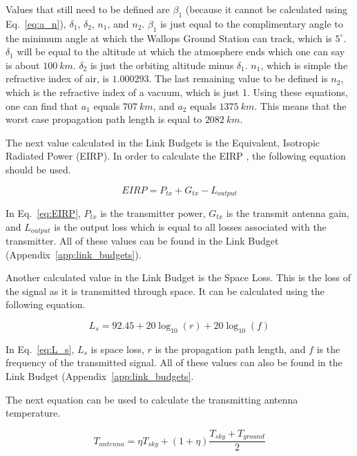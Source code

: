 \documentclass[12pt]{article}
\begin{document}
Values that still need to be defined are $\beta_1$ (because it cannot be calculated using Eq.~\ref{eq:a_n}), $\delta_1$, $\delta_2$, $n_1$, and $n_2$. $\beta_1$ is just equal to the complimentary angle to the minimum angle at which the Wallops Ground Station can track, which is $5^\circ$. $\delta_1$ will be equal to the altitude at which the atmosphere ends which one can say is about $100\ km$. $\delta_2$ is just the orbiting altitude minus $\delta_1$. $n_1$, which is simple the refractive index of air, is $1.000293$. The last remaining value to be defined is $n_2$, which is the refractive index of a vacuum, which is just 1. Using these equations, one can find that $a_1$ equals $707\ km$, and $a_2$ equals $1375\ km$. This means that the worst case propagation path length is equal to $2082\ km$.

The next value calculated in the Link Budgets is the Equivalent, Isotropic Radiated Power (EIRP). In order to calculate the EIRP \cite{SMAD}, the following equation should be used.

\begin{equation}\label{eq:EIRP}
EIRP = P_{tx} + G_{tx} - L_{output} 
\end{equation}

In Eq.~\ref{eq:EIRP}, $P_{tx}$ is the transmitter power, $G_{tx}$ is the transmit antenna gain, and $L_{output}$ is the output loss which is equal to all losses associated with the transmitter. All of these values can be found in the Link Budget (Appendix~\ref{app:link_budgets}).

Another calculated value in the Link Budget is the Space Loss. This is the loss of the signal as it is transmitted through space. It can be calculated \cite{SMAD} using the following equation.

\begin{equation}\label{eq:L_s}
L_s = 92.45 + 20\log_{10}(r) + 20\log_{10}(f) 
\end{equation}

In Eq.~\ref{eq:L_s}, $L_s$ is space loss, $r$ is the propagation path length, and $f$ is the frequency of the transmitted signal. All of these values can also be found in the Link Budget (Appendix~\ref{app:link_budgets}.

The next equation can be used to calculate \cite{pozar} the transmitting antenna temperature.

\begin{equation}\label{eq:t_antenna}
T_{antenna} = \eta T_{sky} + (1 + \eta) \frac{T_{sky} + T_{ground}}{2} 
\end{equation}
\end{document}
